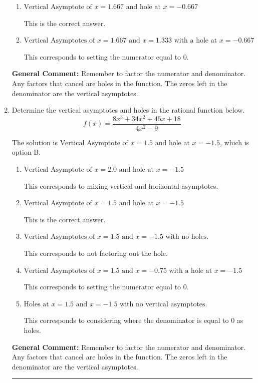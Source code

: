 \documentclass{extbook}[14pt]
\newcommand{\litem}[1]{\item #1

\rule{\textwidth}{0.4pt}}
\begin{document}
\begin{enumerate}
{\begin{enumerate}[label=\Alph*.]
This corresponds to not factoring out the hole.
\item \( \text{Vertical Asymptote of } x = 1.667 \text{ and hole at } x = -0.667 \)

This is the correct answer.
\item \( \text{Vertical Asymptotes of } x = 1.667 \text{ and } x = 1.333 \text{ with a hole at } x = -0.667 \)

This corresponds to setting the numerator equal to 0.
\end{enumerate}

\textbf{General Comment:} Remember to factor the numerator and denominator. Any factors that cancel are holes in the function. The zeros left in the denominator are the vertical asymptotes.
}
\litem{
Determine the vertical asymptotes and holes in the rational function below.
\[ f(x) = \frac{8x^{3} +34 x^{2} +45 x + 18}{4x^{2} -9} \]

The solution is \( \text{Vertical Asymptote of } x = 1.5 \text{ and hole at } x = -1.5 \), which is option B.\begin{enumerate}[label=\Alph*.]
\item \( \text{Vertical Asymptote of } x = 2.0 \text{ and hole at } x = -1.5 \)

This corresponds to mixing vertical and horizontal asymptotes.
\item \( \text{Vertical Asymptote of } x = 1.5 \text{ and hole at } x = -1.5 \)

This is the correct answer.
\item \( \text{Vertical Asymptotes of } x = 1.5 \text{ and } x = -1.5 \text{ with no holes.} \)

This corresponds to not factoring out the hole.
\item \( \text{Vertical Asymptotes of } x = 1.5 \text{ and } x = -0.75 \text{ with a hole at } x = -1.5 \)

This corresponds to setting the numerator equal to 0.
\item \( \text{Holes at } x = 1.5 \text{ and } x = -1.5 \text{ with no vertical asymptotes.} \)

This corresponds to considering where the denominator is equal to 0 as holes.
\end{enumerate}

\textbf{General Comment:} Remember to factor the numerator and denominator. Any factors that cancel are holes in the function. The zeros left in the denominator are the vertical asymptotes.
}
\end{enumerate}
\end{document}
